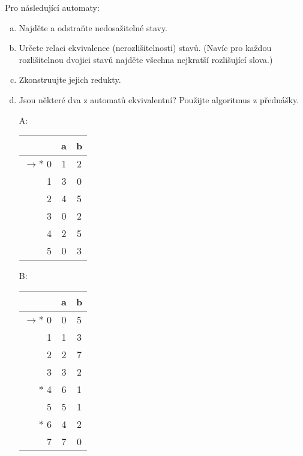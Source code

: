 \documentclass[a4paper,12pt]{amsart}
\begin{document}
\begin{problem}    
    
    Pro následující automaty:

    \begin{enumerate}[(a)]\setlength\itemsep{6pt}
        \item Najděte a odstraňte nedosažitelné stavy.
        \item Určete relaci ekvivalence (nerozlišitelnosti) stavů. (Navíc pro každou rozlišitelnou dvojici stavů najděte všechna nejkratší rozlišující slova.)
        \item Zkonstruujte jejich redukty.
        \item Jsou některé dva z automatů ekvivalentní? Použijte algoritmus z přednášky.
    \end{enumerate}
    
    \vspace{-9pt}
    \begin{multicols}{3}\small
    
        \begin{itemize}
            
            \item[A:] \bigskip
            \begin{tabular}{ r | c c }
            & a & b \\ \hline
            $\to\ast$ 0 & 1 & 2 \\  
            1 & 3 & 0 \\
            2 & 4 & 5 \\
            3 & 0 & 2 \\
            4 & 2 & 5 \\
            5 & 0 & 3
            \end{tabular}
            
            \item[B:] \begin{tabular}{ r | c c }
            & a & b \\ \hline
            $\to\ast$ 0 & 0 & 5 \\  
            1 & 1 & 3 \\
            2 & 2 & 7 \\
            3 & 3 & 2 \\
            $\ast$ 4 & 6 & 1 \\
            5 & 5 & 1 \\
            $\ast$ 6 & 4 & 2 \\
            7 & 7 & 0
            \end{tabular}
                

\end{itemize}
\end{multicols}
\end{problem}
\end{document}
